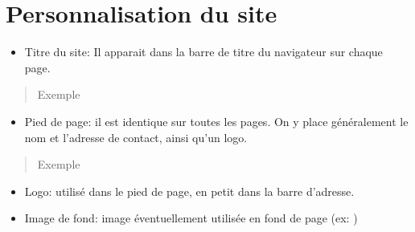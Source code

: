 \documentclass[letterpaper,10pt,english]{sphinxmanual}
\begin{document}
\section{Personnalisation du site}
\label{\detokenize{configurer:personnalisation-du-site}}\begin{itemize}
\item {} 
Titre du site: Il apparait dans la barre de titre du navigateur sur chaque page.

\end{itemize}
\begin{quote}\begin{description}
\item[{Exemple}] \leavevmode
{}

\end{description}\end{quote}
\begin{itemize}
\item {} 
Pied de page: il est identique sur toutes les pages. On y place généralement le nom et l’adresse de contact, ainsi qu’un logo.

\end{itemize}
\begin{quote}\begin{description}
\item[{Exemple}] \leavevmode
{}

\end{description}\end{quote}
\begin{itemize}
\item {} 
Logo: utilisé dans le pied de page, en petit dans la barre d’adresse.

\item {} 
Image de fond: image éventuellement utilisée en fond de page (ex:  )

\end{itemize}
\end{document}
